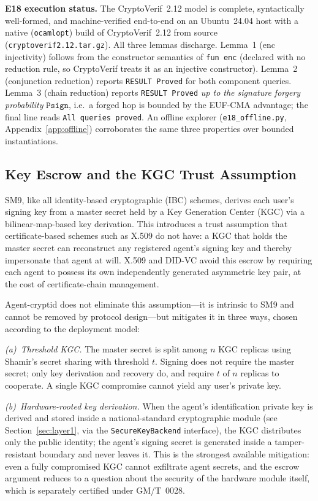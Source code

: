 \documentclass[10pt,twocolumn]{IEEEtran}
\begin{document}
\noindent\textbf{E18 execution status.} The CryptoVerif~2.12 model is
complete, syntactically well-formed, and machine-verified end-to-end on
an Ubuntu~24.04 host with a native (\texttt{ocamlopt}) build of
CryptoVerif~2.12 from source
(\texttt{cryptoverif2.12.tar.gz}). All three lemmas discharge.
Lemma~1 (enc injectivity) follows from the constructor semantics of
\texttt{fun enc} (declared with no reduction rule, so CryptoVerif
treats it as an injective constructor). Lemma~2 (conjunction reduction)
reports \texttt{RESULT Proved} for both component queries. Lemma~3
(chain reduction) reports \texttt{RESULT Proved} \emph{up to the
signature forgery probability} $\texttt{Psign}$, i.e.\ a forged hop is
bounded by the EUF-CMA advantage; the final line reads
\texttt{All queries proved}. An offline explorer
(\texttt{e18\_offline.py}, Appendix~\ref{app:offline}) corroborates the
same three properties over bounded instantiations.

\subsection{Key Escrow and the KGC Trust Assumption}
\label{sec:escrow}

SM9, like all identity-based cryptographic (IBC) schemes,
derives each user's signing key from a master secret held by a Key
Generation Center (KGC) via a bilinear-map-based key derivation. This
introduces a trust assumption that certificate-based schemes such as
X.509 do not have: a KGC that holds the master secret can reconstruct
any registered agent's signing key and thereby impersonate that agent
at will. X.509 and DID-VC avoid this escrow by requiring each agent to
possess its own independently generated asymmetric key pair, at the
cost of certificate-chain management.

Agent-cryptid does not eliminate this assumption---it is intrinsic to
SM9 and cannot be removed by protocol design---but mitigates it in
three ways, chosen according to the deployment model:

\emph{(a)~Threshold KGC.} The master secret is split among $n$ KGC
replicas using Shamir's secret sharing with threshold $t$. Signing
does not require the master secret; only key derivation and recovery
do, and require $t$ of $n$ replicas to cooperate. A single KGC
compromise cannot yield any user's private key.

\emph{(b)~Hardware-rooted key derivation.} When the agent's
identification private key is derived and stored inside a
national-standard cryptographic module (see Section~\ref{sec:layer1},
via the \texttt{SecureKeyBackend} interface), the KGC distributes only
the public identity; the agent's
signing secret is generated inside a tamper-resistant boundary and
never leaves it. This is the strongest available mitigation: even a
fully compromised KGC cannot exfiltrate agent secrets, and the escrow
argument reduces to a question about the security of the hardware
module itself, which is separately certified under GM/T~0028.
\end{document}
